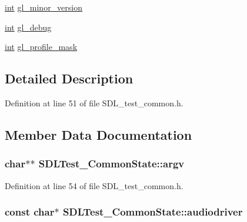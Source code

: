 \begin{DoxyCompactItemize}
\item 
\hyperlink{_s_d_l__thread_8h_a6a64f9be4433e4de6e2f2f548cf3c08e}{int} \hyperlink{struct_s_d_l_test___common_state_a5a50c65004454c791da21a3473388608}{gl\-\_\-minor\-\_\-version}
\item 
\hyperlink{_s_d_l__thread_8h_a6a64f9be4433e4de6e2f2f548cf3c08e}{int} \hyperlink{struct_s_d_l_test___common_state_a2710657ef2a0c8aabebc5fceb01c71b5}{gl\-\_\-debug}
\item 
\hyperlink{_s_d_l__thread_8h_a6a64f9be4433e4de6e2f2f548cf3c08e}{int} \hyperlink{struct_s_d_l_test___common_state_aa923ff5f227c35523a4e491863a7d907}{gl\-\_\-profile\-\_\-mask}
\end{DoxyCompactItemize}


\subsection{Detailed Description}


Definition at line 51 of file S\-D\-L\-\_\-test\-\_\-common.\-h.



\subsection{Member Data Documentation}
\hypertarget{struct_s_d_l_test___common_state_a6db840410b86ab7c6807763fd8bcb081}{
\subsubsection[{argv}]{\setlength{\rightskip}{0pt plus 5cm}char$\ast$$\ast$ S\-D\-L\-Test\-\_\-\-Common\-State\-::argv}}\label{struct_s_d_l_test___common_state_a6db840410b86ab7c6807763fd8bcb081}


Definition at line 54 of file S\-D\-L\-\_\-test\-\_\-common.\-h.

\hypertarget{struct_s_d_l_test___common_state_ae51671cdec7979ca844f19b650b75300}{
\subsubsection[{audiodriver}]{\setlength{\rightskip}{0pt plus 5cm}const char$\ast$ S\-D\-L\-Test\-\_\-\-Common\-State\-::audiodriver}}\label{struct_s_d_l_test___common_state_ae51671cdec7979ca844f19b650b75300}


